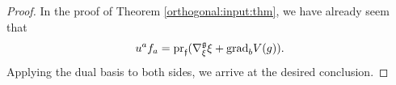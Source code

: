 \documentclass[letterpaper, 10 pt, conference]{ieeeconf}
\newcommand{\grad}{\normalfont{\text{grad}}}
\begin{document}
\begin{proof}
In the proof of Theorem \ref{orthogonal:input:thm}, we have already seem that $$u^af_a=\text{pr}_{\mathfrak{f}}(\nabla^{\mathfrak{g}}_{\xi} \xi + \grad_{b} V(g)).$$ Applying the dual basis to both sides, we arrive at the desired conclusion.


\end{proof}
\end{document}
